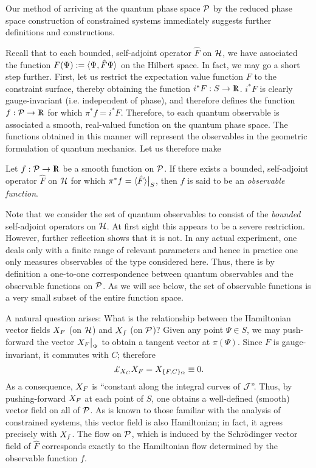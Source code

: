 Our method of arriving at the quantum phase space $\P$ by the reduced
phase space construction of constrained systems immediately suggests
further definitions and constructions.

Recall that to each bounded, self-adjoint operator $\hat{F}$ on $\H$,
we have associated the function $F(\Psi) := \< \Psi, \hat{F} \Psi \>$
on the Hilbert space.  In fact, we may go a short step further.
First, let us restrict the expectation value function $F$ to the
constraint surface, thereby obtaining the function $i^*F : S
\rightarrow \R$.  $i^*F$ is clearly gauge-invariant (i.e. independent
of phase), and therefore defines the function $f: \P \rightarrow \R$
for which $\pi^*f = i^*F$.  Therefore, to each quantum observable is
associated a smooth, real-valued function on the quantum phase space.
The functions obtained in this manner will represent the observables
in the geometric formulation of quantum mechanics. Let us therefore
make
%
\begin{definition} \label{defn_observable_fn}
Let $f: \P \rightarrow \R$ be a smooth function on $\P$.  If there
exists a bounded, self-adjoint operator $\hat{F}$ on $\H$ for which
$\pi^*f = \< \hat{F} \>\big|_S$, then $f$ is said to be an {\em
observable function}.
\end{definition}
\noindent
Note that we consider the set of quantum observables to consist of the
{\em bounded} self-adjoint operators on $\H$. At first sight this
appears to be a severe restriction. However, further reflection shows
that it is not. In any actual experiment, one deals only with a finite
range of relevant parameters and hence in practice one only measures
observables of the type considered here.  Thus, there is by definition
a one-to-one correspondence between quantum observables and the
observable functions on $\P$.  As we will see below, the set of
observable functions is a very small subset of the entire function
space.

A natural question arises: What is the relationship between the
Hamiltonian vector fields $\hvf{F}$ (on $\H$) and $\hvf{f}$ (on $\P$)?
Given any point $\Psi \in S$, we may push-forward the vector
$\hvf{F}\big|_\Psi$ to obtain a tangent vector at $\pi(\Psi)$.  Since
$F$ is gauge-invariant, it commutes with $C$; therefore
%
\[	\lie{\hvf{C}} \hvf{F} = \hvf{ \{ F, C\}_\W} \equiv 0.	\]
%
As a consequence, $\hvf{F}$ is ``constant along the integral curves of
$\J$''.  Thus, by pushing-forward $\hvf{F}$ at each point of $S$, one
obtains a well-defined (smooth) vector field on all of $\P$.  As is
known to those familiar with the analysis of constrained systems, this
vector field is also Hamiltonian; in fact, it agrees precisely with
$\hvf{f}$.  The flow on $\P$, which is induced by the Schr\"odinger
vector field of $\hat{F}$ corresponds exactly to the Hamiltonian flow
determined by the observable function $f$.

